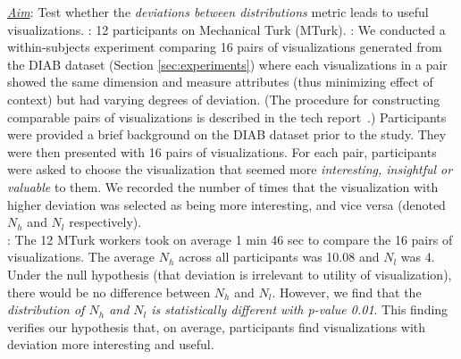 

{\it \underline{Aim}}: Test whether the {\it deviations between distributions} metric leads to useful visualizations.
: 12 participants on Mechanical Turk (MTurk).
: 
We conducted a within-subjects experiment comparing 16 pairs of visualizations generated 
from the DIAB dataset (Section \ref{sec:experiments}) 
where each visualizations in a pair showed the same dimension and measure attributes (thus minimizing effect of context) but had varying degrees of deviation. 
(The procedure for constructing comparable pairs of visualizations is described in the tech report~\cite{seedb-tr}.)
Participants were provided a brief background on the DIAB dataset prior to the study.
They were then presented with 16 pairs of visualizations. 
For each pair, participants were asked to choose the visualization that seemed more {\it interesting, insightful or valuable} to them.
We recorded the number of times that the visualization with higher deviation was selected as being more interesting, and vice versa (denoted $N_h$ and $N_l$ respectively).
\\
: The 12 MTurk workers took on average 
1 min 46 sec to compare the 16 pairs of visualizations.
The average $N_h$ across all participants was 10.08 and $N_l$ was 4.
Under the null hypothesis (that deviation is irrelevant to utility of visualization),
there would be no difference between $N_{h}$ and $N_{l}$.
However, we find that the {\em distribution of $N_{h}$ and $N_{l}$ is statistically different with
p-value 0.01}.
This finding verifies our hypothesis that, on average, participants 
find visualizations with deviation more interesting and useful.


